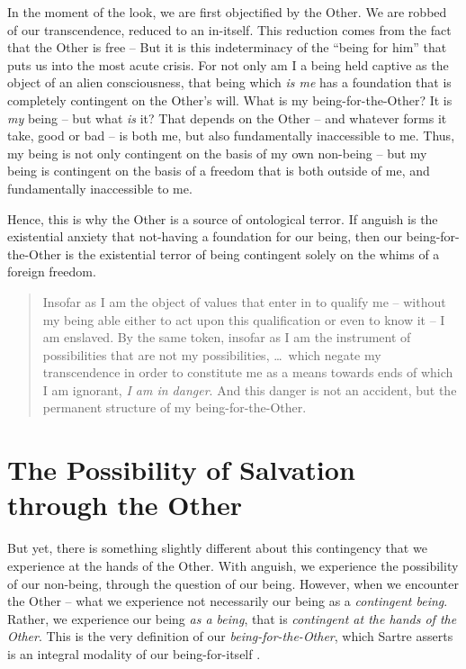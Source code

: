 In the moment of the look, we are first objectified by the Other. We are robbed of our transcendence, reduced to an in-itself. This reduction comes from the fact that the Other is free --  But it is this indeterminacy of the \enquote{being for him} that puts us into the most acute crisis. For not only am I a being held captive as the object of an alien consciousness, that being which \emph{is me} has a foundation that is completely contingent on the Other's will. What is my being-for-the-Other? It is \emph{my} being --  but what \emph{is} it? That depends on the Other -- and whatever forms it take, good or bad -- is both me, but also fundamentally inaccessible to me.  Thus, my being is not only contingent on the basis of my own non-being -- but my being is contingent on the basis of a freedom that is both outside of me, and fundamentally inaccessible to me.

Hence, this is why the Other is a source of ontological terror. If anguish is the existential anxiety that not-having a foundation for our being, then our being-for-the-Other is the existential terror of being contingent solely on the whims of a foreign freedom. 

\blockcquote[366]{Sartre}{Insofar as I am the object of values that enter in to qualify me -- without my being able either to act upon this qualification or even to know it -- I am enslaved. By the same token, insofar as I am the instrument of possibilities that are not my possibilities, \ldots\ which negate my transcendence in order to constitute me as a means towards ends of which I am ignorant, \emph{I am in danger}. And this danger is not an accident, but the permanent structure of my being-for-the-Other.}

\section{The Possibility of Salvation through the Other}

\noindent
But yet, there is something slightly different about this contingency that we experience at the hands of the Other. With anguish, we experience the possibility of our non-being, through the question of our being. However, when we encounter the Other -- what we experience not necessarily our being as a \emph{contingent being}. Rather, we experience our being \emph{as a being}, that is \emph{contingent at the hands of the Other}. This is the very definition of our \emph{being-for-the-Other}, which Sartre asserts is an integral modality of our being-for-itself \autocite[479]{Sartre}.

